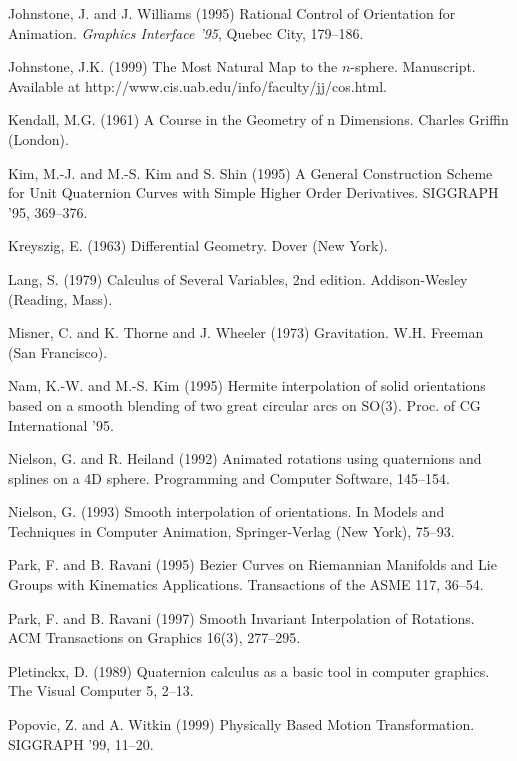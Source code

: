 \begin{thebibliography}{Lozano-Perez 83}
Johnstone, J. and J. Williams (1995)
Rational Control of Orientation for Animation.
{\em Graphics Interface '95}, Quebec City, 179--186.

Johnstone, J.K. (1999)
The Most Natural Map to the $n$-sphere.
Manuscript.
Available at http://www.cis.uab.edu/info/faculty/jj/cos.html.

Kendall, M.G. (1961)
A Course in the Geometry of n Dimensions.
Charles Griffin (London).

Kim, M.-J. and M.-S. Kim and S. Shin (1995)
A General Construction Scheme for Unit Quaternion Curves
with Simple Higher Order Derivatives.
SIGGRAPH '95, 369--376.

Kreyszig, E. (1963)
Differential Geometry.
Dover (New York).

Lang, S. (1979)
Calculus of Several Variables, 2nd edition.
Addison-Wesley (Reading, Mass).

Misner, C. and K. Thorne and J. Wheeler (1973)
Gravitation.
W.H. Freeman (San Francisco).

Nam, K.-W. and M.-S. Kim (1995)
Hermite interpolation of solid orientations based on a smooth blending
of two great circular arcs on SO(3).
Proc. of CG International '95.

Nielson, G. and R. Heiland (1992)
Animated rotations using quaternions and splines on a 4D sphere.
Programming and Computer Software, 145--154.

Nielson, G. (1993)
Smooth interpolation of orientations.
In Models and Techniques in Computer Animation, Springer-Verlag (New York),
75--93.

Park, F. and B. Ravani (1995)
Bezier Curves on Riemannian Manifolds and Lie Groups with
Kinematics Applications.
Transactions of the ASME 117, 36--54.

Park, F. and B. Ravani (1997)
Smooth Invariant Interpolation of Rotations.
ACM Transactions on Graphics 16(3), 277--295.

Pletinckx, D. (1989) 
Quaternion calculus as a basic tool in computer graphics.
The Visual Computer 5, 2--13.

Popovic, Z. and A. Witkin (1999)
Physically Based Motion Transformation.
SIGGRAPH '99, 11--20.


\end{thebibliography}
